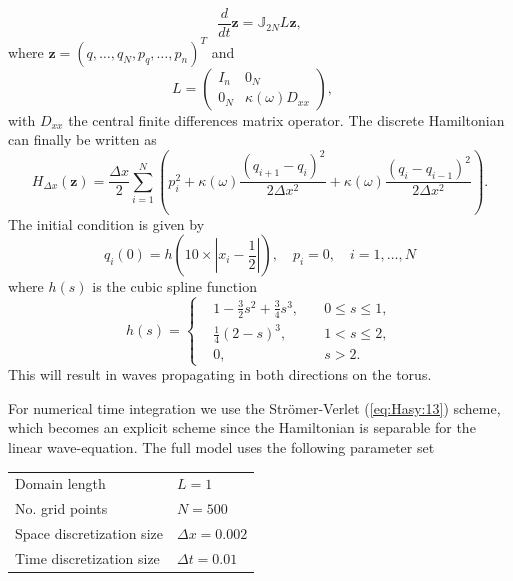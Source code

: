 \begin{equation} \label{eq:NuRe:5}
	\frac{d}{dt} \mathbf z = \mathbb{J}_{2N} L\mathbf z,
\end{equation}
where $\mathbf z=(q,\dots,q_N,p_q,\dots,p_n)^T$ and
\begin{equation} \label{eq:NuRe:6}
L = 
\begin{pmatrix}
	I_n & 0_N \\
	0_N & \kappa(\omega)D_{xx}
\end{pmatrix},\quad 
\end{equation}
with $D_{xx}$ the central finite differences matrix operator. The discrete Hamiltonian can finally be written as
\begin{equation} \label{eq:NuRe:7}
	H_{\Delta x}(\mathbf z) = \frac{\Delta x}2 \sum_{i=1}^{N} \left( p_i^2 + \kappa(\omega) \frac{(q_{i+1} - q_i)^2}{2\Delta x ^ 2} + \kappa(\omega) \frac{(q_{i} - q_{i-1})^2}{2\Delta x ^ 2} \right).
\end{equation}
The initial condition is given by
\begin{equation} \label{eq:NuRe:8}
	q_i(0) = h( 10\times|x_i - \frac{1}{2}| ), \quad p_i = 0, \quad i=1,\dots,N
\end{equation}
where $h(s)$ is the cubic spline function
\begin{equation} \label{eq:NuRe:9}
h(s) = 
\left\{
\begin{aligned}
& 1 - \frac{3}{2}s^2 + \frac{3}{4}s^3, \quad & 0\leq s \leq 1, \\
& \frac{1}{4}(2-s)^3, & 1< s \leq 2, \\
& 0, & s > 2.
\end{aligned}
\right.
\end{equation}
This will result in waves propagating in both directions on the torus.

For numerical time integration we {\edit use} the Str\"omer-Verlet (\ref{eq:Hasy:13}) scheme, which becomes an explicit scheme since the Hamiltonian is separable for the linear wave-equation. The full model uses the following parameter set \vspace{0.5cm}
\begin{center}
\begin{tabular}{|l|l|}
\hline
Domain length & $L = 1$ \\
No. grid points & $N = 500$ \\
Space discretization size & $\Delta x = 0.002$ \\
Time discretization size & $\Delta t = 0.01$ \\
\hline
\end{tabular}
\end{center}
\vspace{0.5cm}

